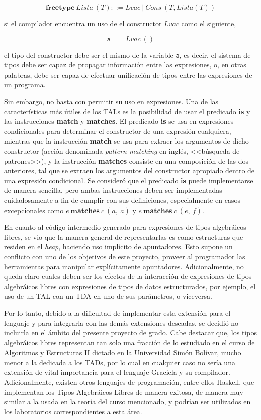 {{$$ \textbf{freetype}\ Lista\ (T) ::= Lvac\ |\ Cons\ (T, Lista (T)) $$

si el compilador encuentra un uso de el constructor $Lvac$ como el siguiente,

$$ \texttt{a ==}\  Lvac\ () $$

el tipo del constructor debe ser el mismo de la variable \texttt{a}, es decir,
el sistema de tipos debe ser capaz de propagar información entre las
expresiones, o, en otras palabras, debe ser capaz de efectuar unificación de
tipos entre las expresiones de un programa.

Sin embargo, no basta con permitir su uso en expresiones. Una de las
características más útiles de los TALs es la posibilidad de usar el predicado
\textbf{is} y las instrucciones \textbf{match} y \textbf{matches}. El predicado
\textbf{is} se usa en expresiones condicionales para determinar el constructor
de una expresión cualquiera, mientras que la instrucción \textbf{match} se usa
para extraer los argumentos de dicho constructor (acción denominada
\textit{pattern matching} en inglés, <<búsqueda de patrones>>), y la instrucción
\textbf{matches} consiste en una composición de las dos anteriores, tal que se
extraen los argumentos del constructor apropiado dentro de una expresión
condicional. Se consideró que el predicado \textbf{is} puede implementarse de
manera sencilla, pero ambas instrucciones deben ser implementadas cuidadosamente
a fin de cumplir con sus definiciones, especialmente en casos excepcionales como
$e\ \textbf{matches}\ c\ (a,\ a)$ y $e\ \textbf{matches}\ c\ (e,\ f)$.

En cuanto al código intermedio generado para expresiones de tipos algebráicos
libres, se vio que la manera general de representarlas es como estructuras que
residen en el \emph{heap}, haciendo uso implícito de apuntadores. Esto supone un
conflicto con uno de los objetivos de este proyecto, proveer al programador las
herramientas para manipular explícitamente apuntadores. Adicionalmente, no queda
claro cuales deben ser los efectos de la interacción de expresiones de tipos
algebráicos libres con expresiones de tipos de datos estructurados, por ejemplo,
el uso de un TAL con un TDA en uno de sus parámetros, o viceversa.

Por lo tanto, debido a la dificultad de implementar esta extensión para el
lenguaje y para integrarla con las demás extensiones deseadas, se decidió no
incluirla en el ámbito del presente proyecto de grado. Cabe destacar que, los
tipos algebráicos libres representan tan solo una fracción de lo estudiado en el
curso de Algoritmos y Estructuras II dictado en la Universidad Simón Bolívar,
mucho menor a la dedicada a los TADs, por lo cual en cualquier caso no sería una
extensión de vital importancia para el lenguaje Graciela y su compilador.
Adicionalmente, existen otros lenguajes de programación, entre ellos Haskell,
que implementan los Tipos Algebráicos Libres de manera exitosa, de manera muy
similar a la usada en la teoría del curso mencionado, y podrían ser utilizados
en los laboratorios correspondientes a esta área.

}}

